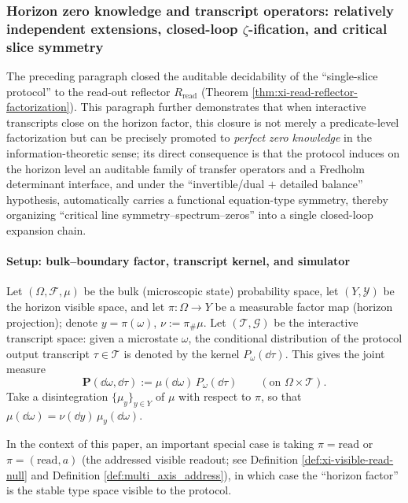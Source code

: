 \subsubsection{Horizon zero knowledge and transcript operators: relatively independent extensions, closed-loop \texorpdfstring{$\zeta$}{zeta}-ification, and critical slice symmetry}\label{subsubsec:xi-horizon-zero-knowledge-operator-model}
The preceding paragraph closed the auditable decidability of the ``single-slice protocol'' to the read-out reflector \(R_{\mathrm{read}}\) (Theorem \ref{thm:xi-read-reflector-factorization}).
This paragraph further demonstrates that when interactive transcripts close on the horizon factor, this closure is not merely a predicate-level factorization but can be precisely promoted to \emph{perfect zero knowledge} in the information-theoretic sense;
its direct consequence is that the protocol induces on the horizon level an auditable family of transfer operators and a Fredholm determinant interface, and under the ``invertible/dual \(+\) detailed balance'' hypothesis, automatically carries a functional equation-type symmetry, thereby organizing ``critical line symmetry--spectrum--zeros'' into a single closed-loop expansion chain.
\par

\paragraph{Setup: bulk--boundary factor, transcript kernel, and simulator}
Let \((\Omega,\mathcal{F},\mu)\) be the bulk (microscopic state) probability space, let \((Y,\mathcal{Y})\) be the horizon visible space, and let \(\pi:\Omega\to Y\) be a measurable factor map (horizon projection); denote \(y=\pi(\omega)\), \(\nu:=\pi_{\#}\mu\).
Let \((\mathcal{T},\mathcal{G})\) be the interactive transcript space: given a microstate \(\omega\), the conditional distribution of the protocol output transcript \(\tau\in\mathcal{T}\) is denoted by the kernel \(P_{\omega}(\dd\tau)\).
This gives the joint measure
\[
\mathbf{P}(\dd\omega,\dd\tau):=\mu(\dd\omega)\,P_{\omega}(\dd\tau)
\qquad(\text{on }\Omega\times\mathcal{T}).
\]
Take a disintegration \(\{\mu_y\}_{y\in Y}\) of \(\mu\) with respect to \(\pi\), so that \(\mu(\dd\omega)=\nu(\dd y)\,\mu_y(\dd\omega)\).
\par
In the context of this paper, an important special case is taking \(\pi=\mathrm{read}\) or \(\pi=(\mathrm{read},a)\) (the addressed visible readout; see Definition \ref{def:xi-visible-read-null} and Definition \ref{def:multi_axis_address}), in which case the ``horizon factor'' is the stable type space visible to the protocol.

